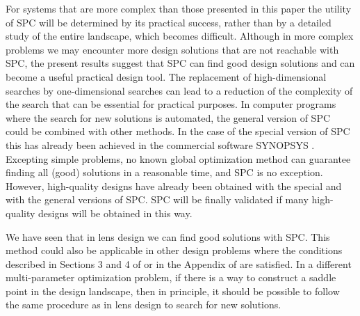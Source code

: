 For systems that are more complex than those presented in this paper the utility of SPC will be determined by its practical success, rather than by a detailed study of the entire landscape, which becomes difficult. Although in more complex problems we may encounter more design solutions that are not reachable with SPC, the present results suggest that SPC can find good design solutions and can become a useful practical design
tool. The replacement of high-dimensional searches by one-dimensional searches can lead to a reduction of the complexity of the search that can be essential for practical purposes. In computer programs where the search for new solutions is automated, the general version of SPC could be combined with other methods. In the case of the special version of SPC this has already been achieved in the commercial software SYNOPSYS \cite{DilworthSP2012}. Excepting simple problems, no known global optimization method can guarantee finding all (good) solutions in a reasonable time, and SPC is no exception. However, high-quality designs have already been obtained with the special \cite{MarinescuSP2008}\cite{BociortPatent2010} and with the general versions \cite{LivshitsSP2014} of SPC. SPC will be finally validated if many high-quality designs will be obtained in this way.

We have seen that in lens design we can find good solutions with SPC. This method could also be applicable in other design problems where the conditions described in Sections 3 and 4 of \cite{MVTurnhoutSPC15} or in the Appendix of \cite{BociortToyModel2010} are satisfied. In a different multi-parameter optimization problem, if there is a way to construct a
saddle point in the design landscape, then in principle, it should be possible to follow the same procedure as in lens design to search for new solutions.



